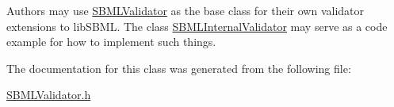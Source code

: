 Authors may use \hyperlink{class_s_b_m_l_validator}{S\+B\+M\+L\+Validator} as the base class for their own validator extensions to lib\+S\+B\+ML. The class \hyperlink{class_s_b_m_l_internal_validator}{S\+B\+M\+L\+Internal\+Validator} may serve as a code example for how to implement such things. 

The documentation for this class was generated from the following file\+:\begin{DoxyCompactItemize}
\item 
\hyperlink{_s_b_m_l_validator_8h}{S\+B\+M\+L\+Validator.\+h}\end{DoxyCompactItemize}
